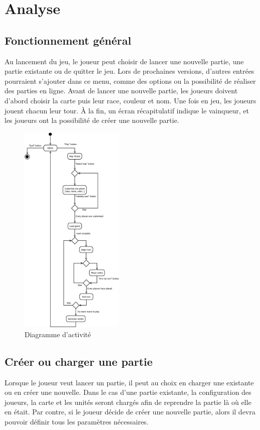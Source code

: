 \section{Analyse}

\subsection{Fonctionnement général}

Au lancement du jeu, le joueur peut choisir de lancer une nouvelle partie, une partie existante ou de quitter le jeu. Lors de prochaines versions, d'autres entrées pourraient s'ajouter dans ce menu, comme des options ou la possibilité de réaliser des parties en ligne. Avant de lancer une nouvelle partie, les joueurs doivent d'abord choisir la carte puis leur race, couleur et nom. Une fois en jeu, les joueurs jouent chacun leur tour. À la fin, un écran récapitulatif indique le vainqueur, et les joueurs ont la possibilité de créer une nouvelle partie.

\begin{figure}[h]
  \centering
  \includegraphics[width=5cm]{schemas/activity.png}
  \caption{Diagramme d'activité}
  \label{activity}
\end{figure}




\subsection{Créer ou charger une partie}

Lorsque le joueur veut lancer un partie, il peut au choix en charger une existante ou en créer une nouvelle. Dans le cas d'une partie existante, la configuration des joueurs, la carte et les unités seront chargés afin de reprendre la partie là où elle en était. Par contre, si le joueur décide de créer une nouvelle partie, alors il devra pouvoir définir tous les paramètres nécessaires.

